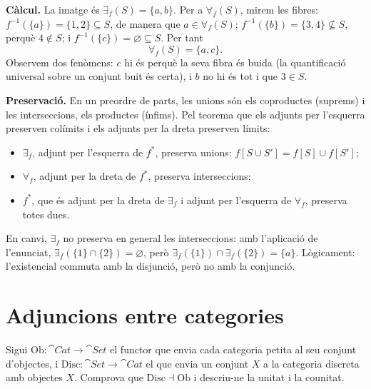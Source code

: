 \begin{solucio}
\textbf{Càlcul.} La imatge és $\exists_f(S)=\{a,b\}$. Per a $\forall_f(S)$, mirem les fibres: $f^{-1}(\{a\})=\{1,2\}\subseteq S$, de manera que $a\in\forall_f(S)$; $f^{-1}(\{b\})=\{3,4\}\not\subseteq S$, perquè $4\notin S$; i $f^{-1}(\{c\})=\varnothing\subseteq S$. Per tant
\[
\forall_f(S)=\{a,c\}.
\]
Observem dos fenòmens: $c$ hi és perquè la seva fibra és buida (la quantificació universal sobre un conjunt buit és certa), i $b$ no hi és tot i que $3\in S$.

\textbf{Preservació.} En un preordre de parts, les unions són els coproductes (suprems) i les interseccions, els productes (ínfims). Pel teorema que els adjunts per l'esquerra preserven colímits i els adjunts per la dreta preserven límits:
\begin{itemize}
  \item $\exists_f$, adjunt per l'esquerra de $f^{*}$, preserva unions: $f[S\cup S']=f[S]\cup f[S']$;
  \item $\forall_f$, adjunt per la dreta de $f^{*}$, preserva interseccions;
  \item $f^{*}$, que és adjunt per la dreta de $\exists_f$ i adjunt per l'esquerra de $\forall_f$, preserva totes dues.
\end{itemize}
En canvi, $\exists_f$ no preserva en general les interseccions: amb l'aplicació de l'enunciat, $\exists_f(\{1\}\cap\{2\})=\varnothing$, però $\exists_f(\{1\})\cap\exists_f(\{2\})=\{a\}$. Lògicament: l'existencial commuta amb la disjunció, però no amb la conjunció.
\end{solucio}

\section{Adjuncions entre categories}

\begin{exercici}\label{pr-disc-ob}
Sigui $\mathrm{Ob}\colon\cat{Cat}\to\cat{Set}$ el functor que envia cada categoria petita al seu conjunt d'objectes, i $\mathrm{Disc}\colon\cat{Set}\to\cat{Cat}$ el que envia un conjunt $X$ a la categoria discreta amb objectes $X$. Comprova que $\mathrm{Disc}\dashv\mathrm{Ob}$ i descriu-ne la unitat i la counitat.
\end{exercici}

